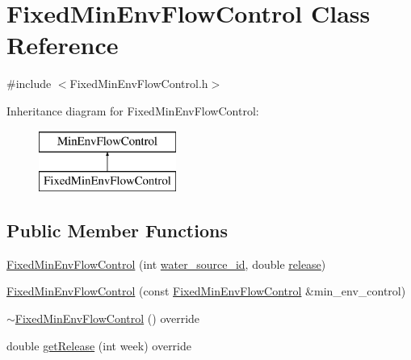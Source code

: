 \hypertarget{classFixedMinEnvFlowControl}{}\section{Fixed\+Min\+Env\+Flow\+Control Class Reference}
\label{classFixedMinEnvFlowControl}


{\ttfamily \#include $<$Fixed\+Min\+Env\+Flow\+Control.\+h$>$}

Inheritance diagram for Fixed\+Min\+Env\+Flow\+Control\+:\begin{figure}[H]
\begin{center}
\leavevmode
\includegraphics[height=2.000000cm]{classFixedMinEnvFlowControl}
\end{center}
\end{figure}
\subsection*{Public Member Functions}
\begin{DoxyCompactItemize}
\item 
\mbox{\hyperlink{classFixedMinEnvFlowControl_ab03711220b87d6490a4c2ca81fcc89a0_ab03711220b87d6490a4c2ca81fcc89a0}{Fixed\+Min\+Env\+Flow\+Control}} (int \mbox{\hyperlink{classMinEnvFlowControl_aada518a047598f386daec1d0358023aa_aada518a047598f386daec1d0358023aa}{water\+\_\+source\+\_\+id}}, double \mbox{\hyperlink{classFixedMinEnvFlowControl_a16665ce65b1fe997390eb913926bd229_a16665ce65b1fe997390eb913926bd229}{release}})
\item 
\mbox{\hyperlink{classFixedMinEnvFlowControl_a57795231f747cae4a4b5b4cf9d4d044f_a57795231f747cae4a4b5b4cf9d4d044f}{Fixed\+Min\+Env\+Flow\+Control}} (const \mbox{\hyperlink{classFixedMinEnvFlowControl}{Fixed\+Min\+Env\+Flow\+Control}} \&min\+\_\+env\+\_\+control)
\item 
\mbox{\hyperlink{classFixedMinEnvFlowControl_ac63298347dcaccf755ea45d1e2f94bad_ac63298347dcaccf755ea45d1e2f94bad}{$\sim$\+Fixed\+Min\+Env\+Flow\+Control}} () override
\item 
double \mbox{\hyperlink{classFixedMinEnvFlowControl_af3ef98eef6a7124738a3b54dcadf757f_af3ef98eef6a7124738a3b54dcadf757f}{get\+Release}} (int week) override
\end{DoxyCompactItemize}
